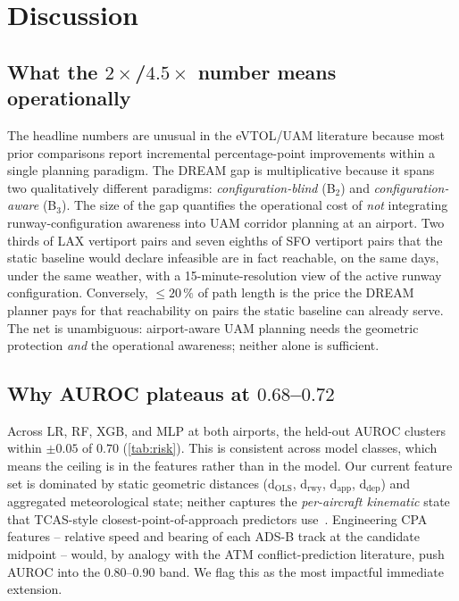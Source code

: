 \section{Discussion}
\label{sec:discussion}

\subsection{What the $2\times$/$4.5\times$ number means operationally}

The headline numbers are unusual in the eVTOL/UAM literature because most
prior comparisons report incremental percentage-point improvements within a
single planning paradigm. The DREAM gap is multiplicative because it spans
two qualitatively different paradigms: \emph{configuration-blind} (B$_2$)
and \emph{configuration-aware} (B$_3$). The size of the gap quantifies the
operational cost of \emph{not} integrating runway-configuration awareness
into UAM corridor planning at an airport. Two thirds of LAX vertiport pairs
and seven eighths of SFO vertiport pairs that the static baseline would
declare infeasible are in fact reachable, on the same days, under the same
weather, with a 15-minute-resolution view of the active runway
configuration. Conversely, $\leq 20\,\%$ of path length is the price the
DREAM planner pays for that reachability on pairs the static baseline can
already serve. The net is unambiguous: airport-aware UAM planning needs the
geometric protection \emph{and} the operational awareness; neither alone
is sufficient.

\subsection{Why AUROC plateaus at $0.68$--$0.72$}

Across LR, RF, XGB, and MLP at both airports, the held-out AUROC clusters
within $\pm 0.05$ of $0.70$ (\cref{tab:risk}). This is consistent across
model classes, which means the ceiling is in the features rather than in the
model. Our current feature set is dominated by static geometric distances
(d$_\mathrm{OLS}$, d$_{\mathrm{rwy}}$, d$_{\mathrm{app}}$, d$_{\mathrm{dep}}$)
and aggregated meteorological state; neither captures the
\emph{per-aircraft kinematic} state that TCAS-style closest-point-of-approach
predictors use~\citep{rtca_dolca,lefebvre2018}. Engineering CPA features --
relative speed and bearing of each ADS-B track at the candidate
midpoint -- would, by analogy with the ATM conflict-prediction literature,
push AUROC into the $0.80$--$0.90$ band. We flag this as the most
impactful immediate extension.

